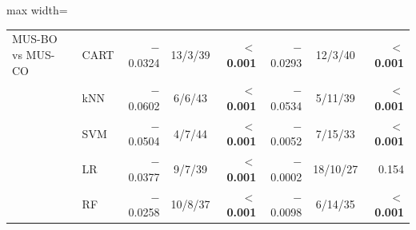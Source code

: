 \begin{table}[!htbp]
\begin{adjustbox}{max width=\linewidth}
\begin{tabular}{llrcrrcr}
\midrule
MUS-BO vs MUS-CO & CART & $-$0.0324 & 13/3/39 & \textbf{$<$0.001} & $-$0.0293 & 12/3/40 & \textbf{$<$0.001} \\
 & kNN & $-$0.0602 & 6/6/43 & \textbf{$<$0.001} & $-$0.0534 & 5/11/39 & \textbf{$<$0.001} \\
 & SVM & $-$0.0504 & 4/7/44 & \textbf{$<$0.001} & $-$0.0052 & 7/15/33 & \textbf{$<$0.001} \\
 & LR & $-$0.0377 & 9/7/39 & \textbf{$<$0.001} & $-$0.0002 & 18/10/27 & 0.154 \\
 & RF & $-$0.0258 & 10/8/37 & \textbf{$<$0.001} & $-$0.0098 & 6/14/35 & \textbf{$<$0.001} \\
\bottomrule
\end{tabular}
\end{adjustbox}
\end{table}
